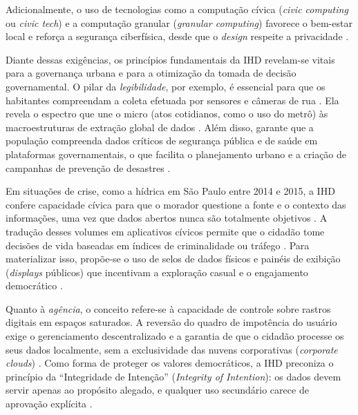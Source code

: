 \documentclass[
	12pt,				%
	oneside,			%
	a4paper,			%
	english,			%
	brazil				%
	]{abntex2ppgsi}
\begin{document}
   Adicionalmente, o uso de tecnologias como a computação cívica (\textit{civic computing} ou \textit{civic tech}) e a computação granular (\textit{granular computing}) favorece o bem-estar local e reforça a segurança ciberfísica, desde que o \textit{design} respeite a privacidade \cite{Konomi2022, Koesten2020, Strey2019Human}.

    Diante dessas exigências, os princípios fundamentais da IHD revelam-se vitais para a governança urbana e para a otimização da tomada de decisão governamental. O pilar da \emph{legibilidade}, por exemplo, é essencial para que os habitantes compreendam a coleta efetuada por sensores e câmeras de rua \cite{Coleti2019DesigPatterns, Hutton2017}. Ela revela o espectro que une o micro (atos cotidianos, como o uso do metrô) às macroestruturas de extração global de dados \cite{Parviainen2016}. Além disso, garante que a população compreenda dados críticos de segurança pública e de saúde em plataformas governamentais, o que facilita o planejamento urbano e a criação de campanhas de prevenção de desastres \cite{Capeleti2024Human, barcellos2022towards, Belizario2023Interacao}.

    Em situações de crise, como a hídrica em São Paulo entre 2014 e 2015, a IHD confere capacidade cívica para que o morador questione a fonte e o contexto das informações, uma vez que dados abertos nunca são totalmente objetivos \cite{Hornung2015}. A tradução desses volumes em aplicativos cívicos permite que o cidadão tome decisões de vida baseadas em índices de criminalidade ou tráfego \cite{Pereira, Cabitza2020131, JoseViterbo2020}. Para materializar isso, propõe-se o uso de selos de dados físicos e painéis de exibição (\textit{displays} públicos) que incentivam a exploração casual e o engajamento democrático \cite{Lindley2020, Coleti2019DesigPatterns, Bartram2022, DeKreij2024, Friedman2024, Alhakamy2021}.

    Quanto à \emph{agência}, o conceito refere-se à capacidade de controle sobre rastros digitais em espaços saturados. A reversão do quadro de impotência do usuário exige o gerenciamento descentralizado e a garantia de que o cidadão processe os seus dados localmente, sem a exclusividade das nuvens corporativas (\textit{corporate clouds}) \cite{Victorelli2024Adopting, durango2024data, Theys2024, Theys, Hutton2017, Meireles2016, Crabtree2016}. Como forma de proteger os valores democráticos, a IHD preconiza o princípio da ``Integridade de Intenção'' (\textit{Integrity of Intention}): os dados devem servir apenas ao propósito alegado, e qualquer uso secundário carece de aprovação explícita \cite{Sailaja2021, Lockwood2021, Mashhadi2014}.
\end{document}
